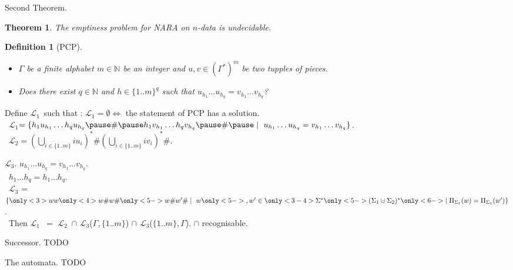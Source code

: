 \documentclass{beamer}
\newtheorem{thr}{Theorem} %
\newtheorem{df}{Definition}
\newcommand{\sm}{\{1..m\}}
\newcommand{\cupdot}{\mathbin{\mathaccent\cdot\cup}}
\newcommand{\Lu}{$\mathcal{L}_{1}$}
\newcommand{\Ld}{$\mathcal{L}_{2}$}
\newcommand{\Lt}{$\mathcal{L}_{3}$}
\begin{document}
\begin{frame}{Second Theorem.}
\pause
  \begin{thr}
    The emptiness problem for \textit{NARA} on $n$-data is undecidable.
  \end{thr}
  \pause
  
  \begin{df}[PCP] 
    \pause
    \begin{itemize}
     \item[Input:] $\Gamma$ be a finite alphabet $m \in \mathbb N$ be an integer and $u,v \in {(\Gamma^*)}^m$ be two tupples of pieces. \pause
     \item[Question:] Does there exist $q \in \mathbb N$ and $h \in {\sm} ^ q$ such that $u_{h_1} \ldots u_{h_q}  = v_{h_1}\ldots v_{h_q}$? \pause
    \end{itemize}
  \end{df}
  Define \Lu\ such that : \Lu $= \emptyset \Leftrightarrow$ the statement of PCP has a solution. \pause \\\
  \Lu $= \{h_1u_{h_1}\ldots h_qu_{h_q} \pause \# \pause h_1v_{h_1}\ldots h_qv_{h_q} \pause \# \pause  \mid \ u_{h_1}\ldots u_{h_q}  = v_{h_1}\ldots v_{h_q}\}$. \pause \\\
  \Ld $= \left(\bigcup\limits_{i\in \sm} iu_i\right)^* \# \left(\bigcup\limits_{i\in \sm} iv_i\right)^* \# $.
\end{frame}
\begin{frame}{\Lt.}
  $u_{h_1}\ldots u_{h_q}  = v_{h_1}\ldots v_{h_q}$. \pause \\\
  $h_1\ldots h_q =h_1\ldots h_q$. \pause \\\
  \Lt\only<5->{$(\Sigma_1,\Sigma_2)$} = $\{ \only<3>{ww} \only<4>{w\#w\#} \only<5->{w\#w'\#}  \mid \  w \only<5-> {,w'} \in \only<3-4> { \Sigma^*} \only<5-> {(\Sigma_1 \cupdot \Sigma_2)^*} 
  \only<6-> {\mid \Pi_{\Sigma_1}(w) = \Pi_{\Sigma_1}(w')}	\}$. \pause \pause \pause \pause \\\
  Then \Lu\ $=$ \pause \Ld\ $\cap$ \pause \Lt($\Gamma,\sm$)   $\cap$ \pause \Lt($\sm,\Gamma$). \pause
  $\cap$ recognisable. 
\end{frame}
\begin{frame}{Successor.}
 TODO
\end{frame}
\begin{frame}{The automata.}
 TODO
\end{frame}

  
\end{document}
